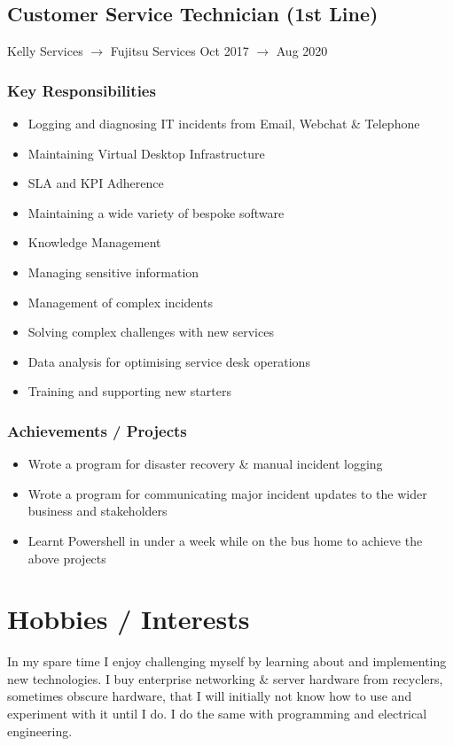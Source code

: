 \documentclass{report}
\begin{document}
	\subsection*{\faPhone \nobreakspace Customer Service Technician (1st Line)}
		Kelly Services $\rightarrow$ Fujitsu Services \hfill Oct 2017 $\rightarrow$ Aug 2020

%			
%
		\subsubsection*{Key Responsibilities}
			\begin{itemize}
				\setlength\itemsep{0pt}
				\item Logging and diagnosing IT incidents from Email, Webchat \& Telephone
				\item Maintaining Virtual Desktop Infrastructure
				\item SLA and KPI Adherence
				\item Maintaining a wide variety of bespoke software
				\item Knowledge Management
				\item Managing sensitive information
				\item Management of complex incidents
				\item Solving complex challenges with new services
				\item Data analysis for optimising service desk operations
				\item Training and supporting new starters
			\end{itemize}
	
		\subsubsection*{Achievements / Projects}
			\begin{itemize}
				\setlength\itemsep{0pt}
				\item Wrote a program for disaster recovery \& manual incident logging
				\item Wrote a program for communicating major incident updates to the wider business and stakeholders
				\item Learnt Powershell in under a week while on the bus home to achieve the above projects
			\end{itemize}
	
	\section*{Hobbies / Interests}
		In my spare time I enjoy challenging myself by learning about and implementing new technologies.
		I buy enterprise networking \& server hardware from recyclers, sometimes obscure hardware,
		that I will initially not know how to use and experiment with it until I do.
		I do the same with programming and electrical engineering.
	
\end{document}
